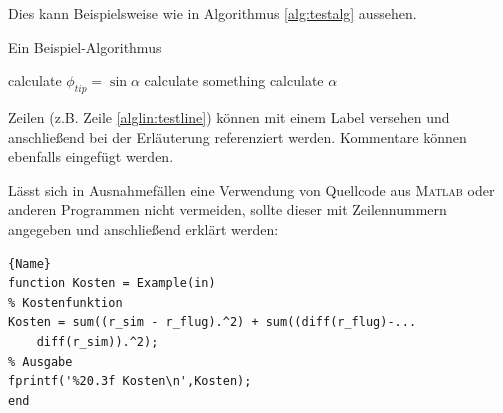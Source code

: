 \documentclass[utf8, a4paper, 11pt, parskip, pointlessnumbers]{scrreprt}
\begin{document}
Dies kann Beispielsweise wie in Algorithmus \ref{alg:testalg} aussehen.
\begin{algorithm}[H]
	\caption{Ein Beispiel-Algorithmus}
	\label{alg:testalg}
	\begin{algorithmic}[1]
		\State calculate $\phi_{tip} = \sin \alpha$ \label{alglin:testline}
		 
		\State calculate something
		\EndWhile {}
		\State calculate $\alpha$
		\EndWhile {}
	\end{algorithmic}
\end{algorithm}
Zeilen (z.B. Zeile \ref{alglin:testline}) können mit einem Label versehen und anschließend bei der Erläuterung referenziert werden. Kommentare können ebenfalls eingefügt werden. 

Lässt sich in Ausnahmefällen eine Verwendung von Quellcode aus \textsc{Matlab} oder anderen Programmen nicht vermeiden, sollte dieser mit Zeilennummern angegeben und anschließend erklärt werden:
\begin{spacing}{1.2}
\begin{lstlisting}[style=mlab,firstnumber = 1]{Name}
function Kosten = Example(in)
% Kostenfunktion
Kosten = sum((r_sim - r_flug).^2) + sum((diff(r_flug)-...
	diff(r_sim)).^2);
% Ausgabe
fprintf('%20.3f Kosten\n',Kosten);
end
\end{lstlisting}
\end{spacing}

%
%
%
\end{document}
